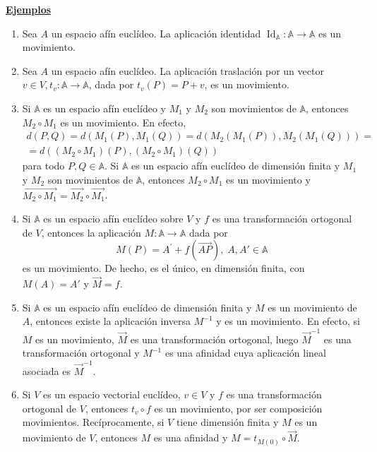 \documentclass[12pt, a4paper, ones, notitlepage, openany,titlepage]{article}
\newcommand{\ejemplos}{\noindent\underline{\textbf{Ejemplos}}}
\begin{document}
\ejemplos
\begin{enumerate}[label=(\arabic*)]
\item Sea $A$ un espacio afín euclídeo. La aplicación identidad $\operatorname{Id}_{\mathbb{A}}: \mathbb{A} \rightarrow \mathbb{A}$ es un movimiento.

\item Sea $A$ un espacio afín euclídeo. La aplicación traslación por un vector $v \in V, t_{v}: \mathbb{A} \rightarrow \mathbb{A}$, dada por $t_{v}(P)=P+v$, es un movimiento.

\item Si $\mathbb{A}$ es un espacio afín euclídeo y $M_{1}$ y $M_{2}$ son movimientos de $\mathbb{A}$, entonces $M_{2} \circ M_{1}$ es un movimiento. En efecto,
\begin{gather*}
d(P, Q)=d\left(M_{1}(P), M_{1}(Q)\right)=d\left(M_{2}\left(M_{1}(P)\right), M_{2}\left(M_{1}(Q)\right)\right)= \\ =d\left(\left(M_{2} \circ M_{1}\right)(P),\left(M_{2} \circ M_{1}\right)(Q)\right)
\end{gather*}
para todo $P, Q \in \mathbb{A}$. Si $\mathbb{A}$ es un espacio afín euclídeo de dimensión finita y $M_{1}$ y $M_{2}$ son movimientos de $\mathbb{A}$, entonces $M_{2} \circ M_{1}$ es un movimiento y $\overrightarrow{M_{2} \circ M_{1}}=\overrightarrow{M_{2}} \circ \overrightarrow{M_{1}}$.

\item Si $\mathbb{A}$ es un espacio afín euclídeo sobre $V$ y $f$ es una transformación ortogonal de $V$, entonces la aplicación $M: \mathbb{A} \rightarrow \mathbb{A}$ dada por
$$
M(P)=A^{\prime}+f(\overrightarrow{A P}), \; A,A' \in \mathbb{A}
$$
es un movimiento. De hecho, es el único, en dimensión finita, con $M(A) = A'$ y $\vec{M} = f$.

\item Si $\mathbb{A}$ es un espacio afín euclídeo de dimensión finita y $M$ es un movimiento de $A$, entonces existe la aplicación inversa $M^{-1}$ y es un movimiento. En efecto, si $M$ es un movimiento, $\vec{M}$ es una transformación ortogonal, luego $\vec{M}^{-1}$ es una transformación ortogonal y $M^{-1}$ es una afinidad cuya aplicación lineal asociada es $\vec{M}^{-1}$.

\item Si $V$ es un espacio vectorial euclídeo, $v \in V$ y $f$ es una transformación ortogonal de $V$, entonces $t_{v} \circ f$ es un movimiento, por ser composición movimientos. Recíprocamente, si $V$ tiene dimensión finita y $M$ es un movimiento de $V$, entonces $M$ es una afinidad y $M=t_{M(0)} \circ \vec{M}$.
\end{enumerate}
\end{document}
